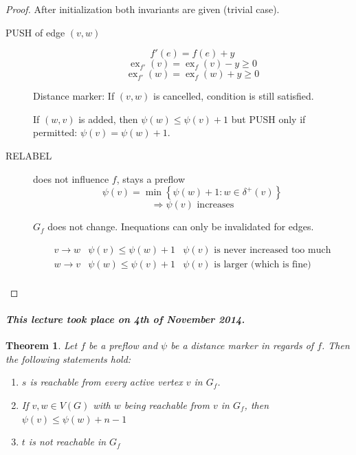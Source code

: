\documentclass{article}
\newtheorem{theorem}{Theorem}
\newcommand{\set}[1]{\left\{#1\right\}}
\newcommand{\dateref}[1]{\paragraph{\textit{This lecture took place on #1.}}}
\begin{document}
\begin{proof}
  After initialization both invariants are given (trivial case).

  \begin{description}
    \item[PUSH of edge $(v, w)$]
      \[ f'(e) = f(e) + y \]
      \[ \operatorname{ex}_{f'}(v) = \operatorname{ex}_f(v) - y \geq 0 \]
      \[ \operatorname{ex}_{f'}(w) = \operatorname{ex}_f(w) + y \geq 0 \]

      Distance marker: If $(v, w)$ is cancelled, condition is still satisfied.

      If $(w, v)$ is added, then $\psi(w) \leq \psi(v) + 1$ but PUSH only if permitted:
      $\psi(v) = \psi(w) + 1$.

    \item[RELABEL] does not influence $f$, stays a preflow
      \[ \psi(v) = \min\set{\psi(w) + 1: w \in \delta^+(v)} \]
      \[ \Rightarrow \psi(v) \text{ increases} \]

      $G_f$ does not change. Inequations can only be invalidated for edges.

      \[
        \begin{array}{lll}
          v \rightarrow w & \psi(v) \leq \psi(w) + 1 & \text{$\psi(v)$ is never increased too much} \\
          w \rightarrow v & \psi(w) \leq \psi(v) + 1 & \text{$\psi(v)$ is larger (which is fine)} \\
        \end{array}
      \]
  \end{description}
\end{proof}

\dateref{4th of November 2014}

\begin{theorem}\label{lemma-4.9}
  Let $f$ be a preflow and $\psi$ be a distance marker in regards of $f$. Then the following statements hold:
  \begin{enumerate}
    \item $s$ is reachable from every active vertex $v$ in $G_f$.
    \item If $v, w \in V(G)$ with $w$ being reachable from $v$ in $G_f$,
          then $\psi(v) \leq \psi(w) + n - 1$
    \item $t$ is not reachable in $G_f$
  \end{enumerate}
\end{theorem}
\end{document}

